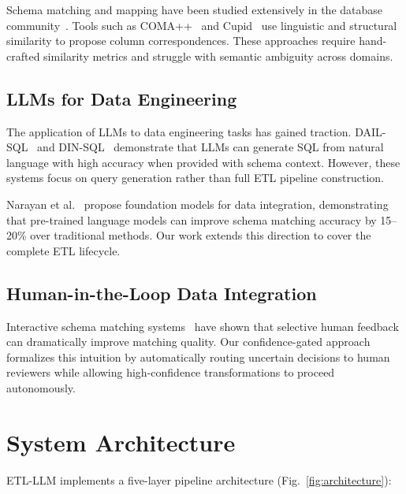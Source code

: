 \documentclass[conference]{IEEEtran}
\begin{document}
Schema matching and mapping have been studied extensively in the database
community~\cite{rahm2001survey, bernstein2011generic}. Tools such as
COMA++~\cite{do2005coma} and Cupid~\cite{madhavan2001generic} use
linguistic and structural similarity to propose column correspondences.
These approaches require hand-crafted similarity metrics and struggle with
semantic ambiguity across domains.

\subsection{LLMs for Data Engineering}

The application of LLMs to data engineering tasks has gained traction.
DAIL-SQL~\cite{gao2023dail} and DIN-SQL~\cite{pourreza2023din} demonstrate
that LLMs can generate SQL from natural language with high accuracy when
provided with schema context. However, these systems focus on query generation
rather than full ETL pipeline construction.

Narayan et al.~\cite{narayan2022foundation} propose foundation models for
data integration, demonstrating that pre-trained language models can improve
schema matching accuracy by 15--20\% over traditional methods. Our work extends
this direction to cover the complete ETL lifecycle.

\subsection{Human-in-the-Loop Data Integration}

Interactive schema matching systems~\cite{chai2009efficiently} have shown that
selective human feedback can dramatically improve matching quality. Our
confidence-gated approach formalizes this intuition by automatically routing
uncertain decisions to human reviewers while allowing high-confidence
transformations to proceed autonomously.

\section{System Architecture}
\label{sec:architecture}

\textsc{ETL-LLM} implements a five-layer pipeline architecture
(Fig.~\ref{fig:architecture}):
\end{document}
